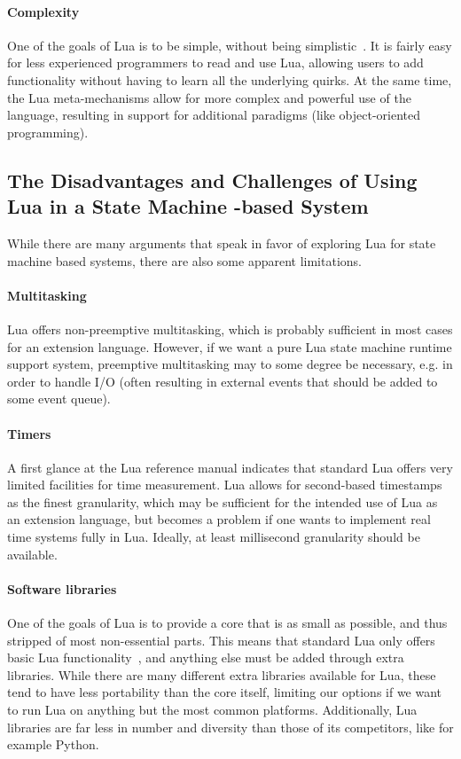 \paragraph{Complexity}
One of the goals of Lua is to be simple, without being simplistic~\cite{article:the_implementation_of_lua}. It is fairly easy for less experienced programmers to read and use Lua, allowing users to add functionality without having to learn all the underlying quirks. At the same time, the Lua meta-mechanisms allow for more complex and powerful use of the language, resulting in support for additional paradigms (like object-oriented programming).

\subsection{The Disadvantages and Challenges of Using Lua in a State Machine -based System}
\label{sec:lua_disadvantages}
While there are many arguments that speak in favor of exploring Lua for state machine based systems, there are also some apparent limitations.

\paragraph{Multitasking}
Lua offers non-preemptive multitasking, which is probably sufficient in most cases for an extension language. However, if we want a pure Lua state machine runtime support system, preemptive multitasking may to some degree be necessary, e.g. in order to handle I/O (often resulting in external events that should be added to some event queue).

\paragraph{Timers}
A first glance at the Lua reference manual indicates that standard Lua offers very limited facilities for time measurement. Lua allows for second-based timestamps as the finest granularity, which may be sufficient for the intended use of Lua as an extension language, but becomes a problem if one wants to implement real time systems fully in Lua. Ideally, at least millisecond granularity should be available.

\paragraph{Software libraries}
One of the goals of Lua is to provide a core that is as small as possible, and thus stripped of most non-essential parts. This means that standard Lua only offers basic Lua functionality~\cite[ch. 6]{manual:lua_reference_manual}, and anything else must be added through extra libraries. While there are many different extra libraries available for Lua, these tend to have less portability than the core itself, limiting our options if we want to run Lua on anything but the most common platforms. Additionally, Lua libraries are far less in number and diversity than those of its competitors, like for example Python.

